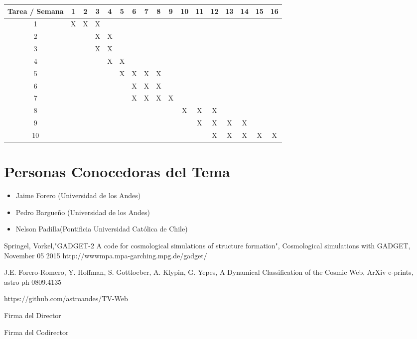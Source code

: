 \documentclass{article}
\begin{document}
\begin{table}[h]

\begin{tabular}{|c||c|c|c|c|c|c|c|c|c|c|c|c|c|c|c|c|}

\hline
Tarea / Semana & 1 & 2 & 3 & 4 & 5 & 6 & 7 & 8 & 9 & 10 & 11 & 12 & 13 & 14 & 15 & 16  \\
\hline\hline
1 & X & X & X &  &   &   &   &   &   &   &   &   &   &   &   &  \\
\hline
2 &   &  & X & X &  &   &   &   &   &   &   &   &   &   &   &  \\
\hline
3 &   &   &  X & X  & & &  &   &   &   &   &   &   &   &   &  \\
\hline
4 &   &   &   &  X & X  &  &  &  &   &   &   &   &   &   &   &  \\
\hline
5 &   &   &   &   & X  & X & X &  X &  &   &   &   &   &   &   &  \\
\hline
6 &   &   &   &   &   & X  & X & X &   &   &   &   &   &   &   &  \\
\hline
7 &   &   &   &   &   & X & X & X & X &  &  &  &  &   &   &  \\
\hline
8 &   &   &   &   &   &   &   &   &   & X & X & X &  &   &   &  \\
\hline
9 &   &   &   &   &   &   &   &   &   &   & X  & X & X & X &  &  \\
\hline
10 &   &   &   &   &   &   &   &   &   &   &   & X & X & X & X & X\\
\hline



\end{tabular}

\end{table}

\section{Personas Conocedoras del Tema}

\begin{itemize}

\item Jaime Forero (Universidad de los Andes)
\item Pedro Bargueño (Universidad de los Andes)
\item Nelson Padilla(Pontificia Universidad Católica de Chile)

\end{itemize}


\begin{thebibliography}{9}

Springel, Vorkel,"GADGET-2 A code for cosmological simulations of structure formation", Cosmological simulations with GADGET, November 05 2015
http://wwwmpa.mpa-garching.mpg.de/gadget/

J.E. Forero-Romero, Y. Hoffman, S. Gottloeber, A. Klypin, G. Yepes, A Dynamical Classification of the Cosmic Web, ArXiv e-prints, astro-ph 0809.4135

https://github.com/astroandes/TV-Web


\end{thebibliography}

Firma del Director


Firma del Codirector
\end{document}

